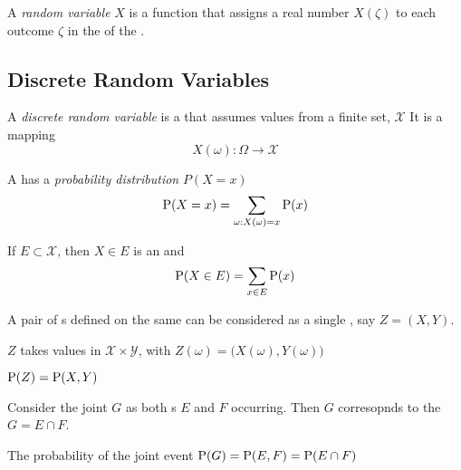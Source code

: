 \begin{definition}\label{def:Random_Variable}
  A \emph{random variable} $X$ is a function that assigns a real number $X(\zeta)$ to each outcome $\zeta$ in the  of the .
\end{definition}

\subsection{Discrete Random Variables}\label{subsec:Discrete_Random_Variables}
\begin{definition}\label{def:Discrete_Random_Variable}
  A \emph{discrete random variable} is a  that assumes values from a finite set, $\mathcal{X}$
  It is a mapping
  \begin{equation}\label{eq:Discrete_Random_Variable}
    X(\omega) : \Omega \to \mathcal{X}
  \end{equation}
\end{definition}

\begin{definition}\label{def:Probability_Distribution}
  A  has a \emph{probability distribution} $P(X=x)$
  \begin{equation}\label{eq:Probability_Distribution}
    \operatorname{\operatorname{P}}(X=x) = \sum\limits_{\omega : X(\omega) = x} \operatorname{\operatorname{P}}(x)
  \end{equation}

  If $E \subset \mathcal{X}$, then $X \in E$ is an  and
  \begin{equation}\label{eq:7}
    \operatorname{\operatorname{P}}(X \in E) = \sum\limits_{x \in E} \operatorname{\operatorname{P}}(x)
  \end{equation}
\end{definition}

\begin{propertylist}
\item A pair of s defined on the same  can be considered as a single , say $Z = (X,Y)$.
\item $Z$ takes values in $\mathcal{X} \times \mathcal{Y}$, with $Z(\omega) = \bigl( X(\omega), Y(\omega) \bigr)$
\item $\operatorname{\operatorname{P}}(Z) = \operatorname{\operatorname{P}}(X,Y)$
\item Consider the joint  $G$ as both s $E$ and $F$ occurring. Then $G$ corresopnds to the  $G = E \cap F$.
\item The probability of the joint event $\operatorname{\operatorname{P}}(G) = \operatorname{\operatorname{P}}(E,F) = \operatorname{\operatorname{P}}(E \cap F)$
\end{propertylist}

